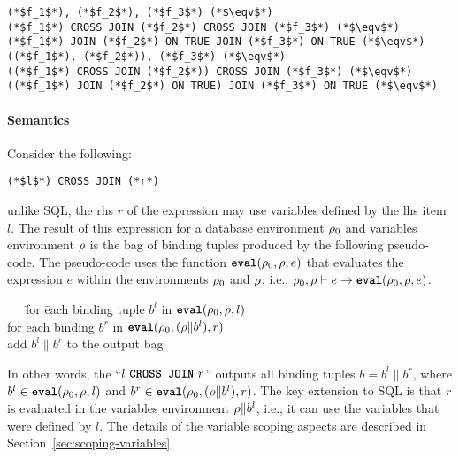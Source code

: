 \begin{lstlisting}
(*$f_1$*), (*$f_2$*), (*$f_3$*) (*$\eqv$*)
(*$f_1$*) CROSS JOIN (*$f_2$*) CROSS JOIN (*$f_3$*) (*$\eqv$*)
(*$f_1$*) JOIN (*$f_2$*) ON TRUE JOIN (*$f_3$*) ON TRUE (*$\eqv$*)
((*$f_1$*), (*$f_2$*)), (*$f_3$*) (*$\eqv$*)
((*$f_1$*) CROSS JOIN (*$f_2$*)) CROSS JOIN (*$f_3$*) (*$\eqv$*)
((*$f_1$*) JOIN (*$f_2$*) ON TRUE) JOIN (*$f_3$*) ON TRUE (*$\eqv$*)
\end{lstlisting}

\paragraph{Semantics} Consider the following:

\begin{lstlisting}
(*$l$*) CROSS JOIN (*r*)
\end{lstlisting}

\noindent unlike SQL, the rhs $r$ of the expression may use variables defined by
the lhs item $l$.  The result of this expression for a database environment
$\rho_{0}$ and variables environment $\rho$ is the bag of binding tuples produced by
the following pseudo-code. The pseudo-code uses the function $\texttt{\textbf{eval}}(\rho_{0}, \rho,
e)$ that evaluates the expression $e$ within the environments $\rho_{0}$ and $\rho$,
i.e., $\rho_{0}, \rho \vdash e \rightarrow \texttt{\textbf{eval}}(\rho_{0}, \rho, e)$.

\begin{tabbing}
\ \ \ \=for \=each binding tuple $b^l$ in $\texttt{\textbf{eval}}(\rho_{0}, \rho, l)$\\
\>\>for \=each binding $b^r$ in $\texttt{\textbf{eval}}(\rho_{0}, (\rho \| b^l), r)$\\
\>\>\>add $b^l \| b^r$ to the output bag
\end{tabbing}

In other words, the ``$l\ \CROSSJOIN\ r$'' outputs all binding tuples $b = b^l
\| b^r$, where $b^l \in \texttt{\textbf{eval}}(\rho_{0}, \rho, l)$ and $b^r \in \texttt{\textbf{eval}}(\rho_{0}, (\rho \|
b^l), r)$. The key extension to SQL is that $r$ is evaluated in the variables
environment $\rho \| b^l$, i.e., it can use the variables that were defined by
$l$. The details of the variable scoping aspects are described in
Section~\ref{sec:scoping-variables}.

